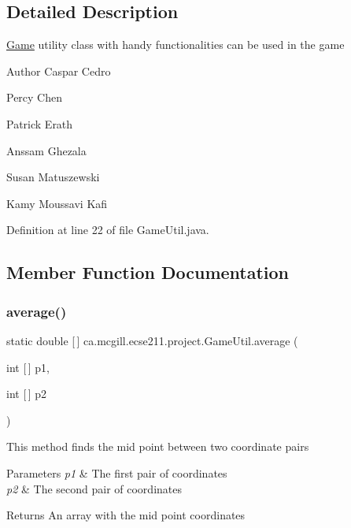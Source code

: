 \subsection{Detailed Description}
\hyperlink{enumca_1_1mcgill_1_1ecse211_1_1project_1_1_game}{Game} utility class with handy functionalities can be used in the game

\begin{DoxyAuthor}{Author}
Caspar Cedro 

Percy Chen 

Patrick Erath 

Anssam Ghezala 

Susan Matuszewski 

Kamy Moussavi Kafi 
\end{DoxyAuthor}


Definition at line 22 of file Game\+Util.\+java.



\subsection{Member Function Documentation}
\mbox{\label{classca_1_1mcgill_1_1ecse211_1_1project_1_1_game_util_ae5c5c445ab84516991219ca3783fcaa4}} 
\subsubsection{\texorpdfstring{average()}{average()}}
{\footnotesize\ttfamily static double \mbox{[}$\,$\mbox{]} ca.\+mcgill.\+ecse211.\+project.\+Game\+Util.\+average (\begin{DoxyParamCaption}\item[{int \mbox{[}$\,$\mbox{]}}]{p1,  }\item[{int \mbox{[}$\,$\mbox{]}}]{p2 }\end{DoxyParamCaption})\hspace{0.3cm}{\ttfamily [static]}}

This method finds the mid point between two coordinate pairs


\begin{DoxyParams}{Parameters}
{\em p1} & The first pair of coordinates \\
\hline
{\em p2} & The second pair of coordinates \\
\hline
\end{DoxyParams}
\begin{DoxyReturn}{Returns}
An array with the mid point coordinates 
\end{DoxyReturn}


